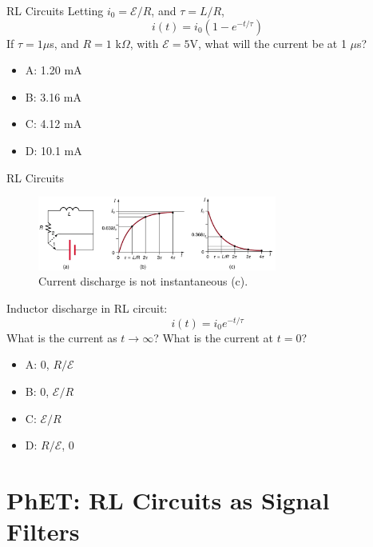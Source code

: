 \documentclass{beamer}
\begin{document}
\begin{frame}{RL Circuits}
Letting $i_0 = \mathcal{E}/R$, and $\tau = L/R$,
\begin{equation}
i(t) = i_0\left(1 - e^{-t/\tau}\right)
\end{equation}
If $\tau = 1 \mu$s, and $R = 1$ k$\Omega$, with $\mathcal{E} = 5$V, what will the current be at 1 $\mu$s?
\begin{itemize}
\item A: 1.20 mA
\item B: 3.16 mA
\item C: 4.12 mA
\item D: 10.1 mA
\end{itemize}
\end{frame}

\begin{frame}{RL Circuits}
\footnotesize
\begin{figure}
\centering
\includegraphics[width=0.7\textwidth]{figures/RL_circuit.png}
\caption{\label{fig:RL2} Current discharge is not instantaneous (c).}
\end{figure}
Inductor discharge in RL circuit:
\begin{equation}
i(t) = i_0 e^{-t/\tau}
\end{equation}
What is the current as $t \to \infty$?  What is the current at $t=0$?
\begin{itemize}
\item A: 0, $R/\mathcal{E}$
\item B: 0, $\mathcal{E}/R$
\item C: $\mathcal{E}/R$
\item D: $R/\mathcal{E}$, 0
\end{itemize}
\end{frame}

\section{PhET: RL Circuits as Signal Filters}
\end{document}
